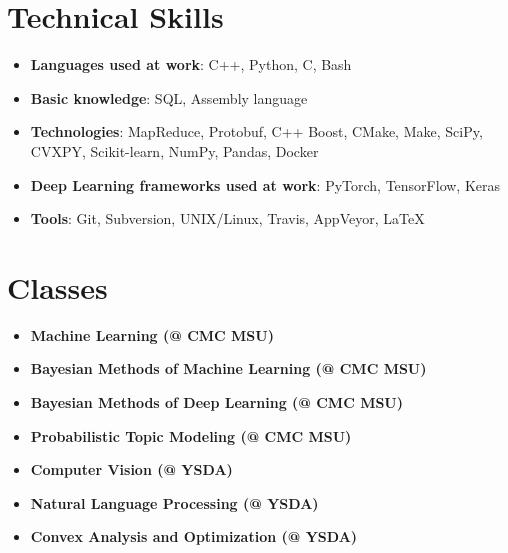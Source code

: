 \documentclass[letterpaper,11pt]{article}
\newcommand{\resumeItem}[2]{
  \item\small{
    \textbf{#1}{: #2 \vspace{-2pt}}
  }
}
\newcommand{\resumeSubItem}[2]{\resumeItem{#1}{#2}\vspace{-4pt}}
\newcommand{\resumeSubHeadingListStart}{\begin{itemize}[leftmargin=*]}
\newcommand{\resumeSubHeadingListEnd}{\end{itemize}}
\begin{document}
\vspace{-22pt}
\section{Technical Skills}
  \resumeSubHeadingListStart
    \resumeSubItem{Languages used at work}{C++, Python, C, Bash}
    \resumeSubItem{Basic knowledge}{SQL, Assembly language}
    \resumeSubItem{Technologies}{MapReduce, Protobuf, C++ Boost, CMake, Make, SciPy, CVXPY, Scikit-learn, NumPy, Pandas, Docker}
    \resumeSubItem{Deep Learning frameworks used at work}{PyTorch, TensorFlow, Keras}
    \resumeSubItem{Tools}{Git, Subversion, UNIX/Linux, Travis, AppVeyor, \LaTeX}
  \resumeSubHeadingListEnd


\vspace{-23pt}
\section{Classes}
  \resumeSubHeadingListStart
      \item{
        \textbf{Machine Learning (@ CMC MSU)} \\
      }
      \vspace{-4pt}
      \item{
        \textbf{Bayesian Methods of Machine Learning (@ CMC MSU)} \\
      }
      \vspace{-4pt}
      \item{
        \textbf{Bayesian Methods of Deep Learning (@ CMC MSU)} \\
      }
      \vspace{-4pt}
      \item{
        \textbf{Probabilistic Topic Modeling (@ CMC MSU)} \\
      }
      \vspace{-4pt}
      \item{
        \textbf{Computer Vision (@ YSDA)} \\
      }
      \vspace{-4pt}
      \item{
        \textbf{Natural Language Processing (@ YSDA)} \\
      }
      \vspace{-4pt}
      \item{
        \textbf{Convex Analysis and Optimization (@ YSDA)} \\
      }
      \resumeSubHeadingListEnd
\end{document}
